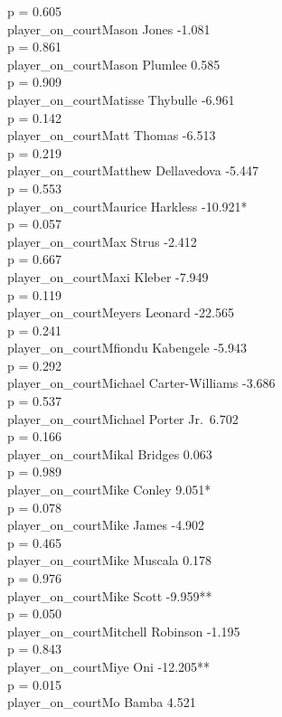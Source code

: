 \documentclass[
  landscape]{article}
\begin{document}
p = 0.605\\
player\_on\_courtMason Jones -1.081\\
p = 0.861\\
player\_on\_courtMason Plumlee 0.585\\
p = 0.909\\
player\_on\_courtMatisse Thybulle -6.961\\
p = 0.142\\
player\_on\_courtMatt Thomas -6.513\\
p = 0.219\\
player\_on\_courtMatthew Dellavedova -5.447\\
p = 0.553\\
player\_on\_courtMaurice Harkless -10.921*\\
p = 0.057\\
player\_on\_courtMax Strus -2.412\\
p = 0.667\\
player\_on\_courtMaxi Kleber -7.949\\
p = 0.119\\
player\_on\_courtMeyers Leonard -22.565\\
p = 0.241\\
player\_on\_courtMfiondu Kabengele -5.943\\
p = 0.292\\
player\_on\_courtMichael Carter-Williams -3.686\\
p = 0.537\\
player\_on\_courtMichael Porter Jr.~6.702\\
p = 0.166\\
player\_on\_courtMikal Bridges 0.063\\
p = 0.989\\
player\_on\_courtMike Conley 9.051*\\
p = 0.078\\
player\_on\_courtMike James -4.902\\
p = 0.465\\
player\_on\_courtMike Muscala 0.178\\
p = 0.976\\
player\_on\_courtMike Scott -9.959**\\
p = 0.050\\
player\_on\_courtMitchell Robinson -1.195\\
p = 0.843\\
player\_on\_courtMiye Oni -12.205**\\
p = 0.015\\
player\_on\_courtMo Bamba 4.521\\
\end{document}
